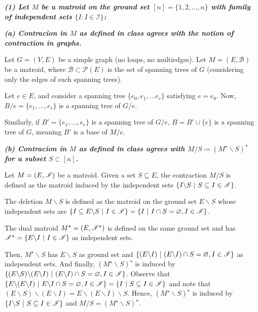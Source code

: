 \textbf{\textit{(1) Let $M$ be a matroid on the ground set $[n] = \lbrace 1, 2, \dots, n \rbrace$ with family of independent sets $\lbrace I : I \in \mathcal{I}\rbrace$:}}

\vspace{3pt}

\hspace{5pt} \textbf{\textit{(a) Contracion in $M$ as defined in class agrees with the notion of contraction in graphs.}}

\vspace{3pt}

Let $G = (V, E)$ be a simple graph (no loops, no multiedges). Let $M = (E, \mathcal B)$ be a matroid, where $\mathcal B \subset \mathcal P(E)$ is the set of spanning trees of $G$ (considering only the edges of such spanning trees).

Let $e \in E$, and consider a spanning tree $\{e_0, e_1, \ldots e_r\}$ satisfying $e = e_0$. Now, $B/e = \{e_1, \ldots, e_r\}$ is a spanning tree of $G/e$.

Similarly, if $B' = \{e_1, \ldots, e_r\}$ is a spanning tree of $G/e$, $B = B' \cup \{e\}$ is a spanning tree of $G$, meaning $B'$ is a base of $M/e$.


\hspace{5pt} \textbf{\textit{(b) Contracion in $M$ as defined in class agrees with $M / S \coloneqq (M^\star \backslash S)^\star$ for a subset $S \subset [n]$.}}

\vspace{3pt}

Let $M=(E,\mathscr{I})$ be a matroid. Given a set $S\subseteq E$, the contraction $M/S$ is defined as the matroid induced by the independent sets $\{I \backslash S \ | \ S\subseteq I \in \I\}$.

The deletion $M \backslash S$ is defined as the matroid on the ground set $E\backslash S$ whose independent sets are $\{I\subseteq E\backslash S \ | \ I\in\mathscr{I}\} = \{I \ | \ I\cap S = \varnothing, I\in\mathscr{I}\}$.

The dual matroid $M^\star=(E,\mathscr{I}^\star)$ is defined on the same ground set and has $\mathscr{I}^\star=\{E \backslash I \ | \ I\in\mathscr{I}\}$ as independent sets.

Then, $M^\star \backslash S$ has $E\backslash S$ as ground set and $\{(E\backslash I) \ | \ (E \backslash I)\cap S=\varnothing, I\in\mathscr{I}\}$ as independent sets. And finally, $(M^\star \backslash S)^\star$ is induced by $\{(E\backslash S)\backslash (E\backslash I) \ | \ (E \backslash I)\cap S=\varnothing, I\in\mathscr{I}\}$. Observe that $\{E\backslash(E\backslash I) \ | \ E\backslash I \cap S = \varnothing,I\in\mathscr{I}\}=\{I \ | \ S\subseteq I\in \mathscr{I}\}$ and note that $(E\backslash S)\backslash (E\backslash I) = E\backslash(E\backslash I)\backslash S$. Hence, $(M^\star \backslash S)^\star$ is induced by $\{I \backslash S \ | \ S\subseteq I \in \I\}$ and $M/S=(M^\star \backslash S)^\star$.

